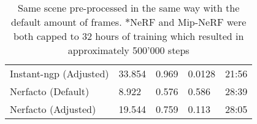 \begin{table}[h]
\begin{tabular}{|l|llll|}
Instant-ngp (Adjusted)     & 33.854    & 0.969     & 0.0128    & 21:56    \\
Nerfacto (Default)    & 8.922    & 0.576     & 0.586    & 28:39    \\ 
Nerfacto (Adjusted)    & 19.544    & 0.759     & 0.113    & 28:05    \\ 
\hline
\end{tabular}
\caption{Same scene pre-processed in the same way with the default amount of frames. $\ast$NeRF and Mip-NeRF were both capped to 32 hours of training which resulted in approximately 500'000 steps}
\label{tab:method-comparison}
\end{table}